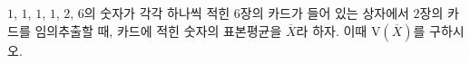 $1$, $1$, $1$, $1$, $2$, $6$의 숫자가 각각 하나씩 적힌 $6$장의 카드가 들어 있는 상자에서 $2$장의 카드를 임의추출할 때, 카드에 적힌 숫자의 표본평균을 $\overline{X}$라 하자. 이때 $\mathrm{V}(\overline{X})$를 구하시오.

